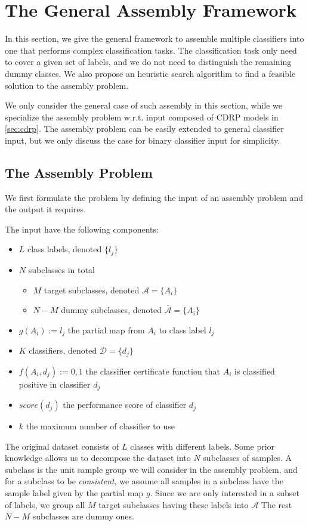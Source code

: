 \documentclass[sigplan,10pt,review]{acmart}\settopmatter{printfolios=true,printccs=false,printacmref=false}
\begin{document}
\section{The General Assembly Framework}
\label{sec:assembly}
In this section, we give the general framework to assemble multiple classifiers into one that performs complex classification tasks.
The classification task only need to cover a given set of labels, and we do not need to distinguish the remaining dummy classes.
We also propose an heuristic search algorithm to find a feasible solution to the assembly problem.

We only consider the general case of such assembly in this section, while we specialize the assembly problem w.r.t. input composed of CDRP models in \cref{sec:cdrp}.
The assembly problem can be easily extended to general classifier input, but we only discuss the case for binary classifier input for simplicity.

\subsection{The Assembly Problem}
\label{sec:assemble-problem}
We first formulate the problem by defining the input of an assembly problem and the output it requires.

The input have the following components:
\begin{itemize}
	\item $L$ class labels, denoted $\{l_j\}$
	\item $N$ subclasses in total \begin{itemize}
		\item $M$ target subclasses, denoted $\mathcal{A} = \{A_i\}$
		\item $N-M$ dummy subclasses, denoted $\bar{\mathcal{A}} = \{A_i\}$
	\end{itemize}
	\item $g(A_i) := l_j$ the partial map from $A_i$ to class label $l_j$
	\item $K$ classifiers, denoted $\mathcal{D} = \{d_j\}$
	\item $f(A_i, d_j) := 0, 1$ the classifier certificate function that $A_i$ is classified positive in classifier $d_j$
	\item $score(d_j)$ the performance score of classifier $d_j$
	\item $k$ the maximum number of classifier to use
\end{itemize}

The original dataset consists of $L$ classes with different labels.
Some prior knowledge allows us to decompose the dataset into $N$ subclasses of samples.
A subclass is the unit sample group we will consider in the assembly problem, and for a subclass to be \textit{consistent}, we assume all samples in a subclass have the sample label given by the partial map $g$.
Since we are only interested in a subset of labels, we group all $M$ target subclasses having these labels into $\mathcal{A}$
The rest $N-M$ subclasses are dummy ones.
\end{document}
